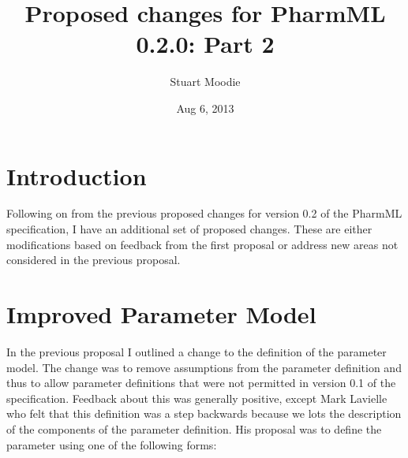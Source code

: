 \documentclass[a4paper,11pt]{article}
\author{Stuart Moodie}
\date{Aug 6, 2013}
\title{Proposed changes for PharmML 0.2.0: Part 2}
\newcommand{\pharmml}{PharmML\xspace}
\begin{document}
\maketitle

\tableofcontents

\section{Introduction}

Following on from the previous proposed changes for version 0.2 of the
\pharmml specification, I have an additional set of proposed
changes. These are either modifications based on feedback from the
first proposal or address new areas not considered in the previous proposal.


\section{Improved Parameter Model}

In the previous proposal I outlined a change to the definition of the
parameter model. The change was to remove assumptions from the
parameter definition and thus to allow parameter definitions that were
not permitted in version 0.1 of the specification. Feedback about this
was generally positive, except Mark Lavielle who felt that this
definition was  a step backwards because we lots the description of
the components of the parameter definition. His proposal was to
define the parameter using one of the following forms:
\end{document}
